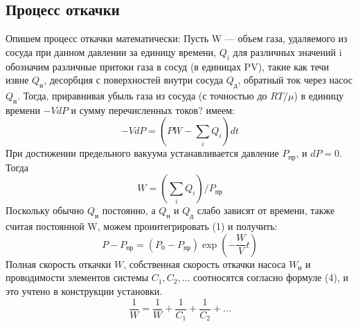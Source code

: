 \documentclass[12pt,a4paper]{article}
\begin{document}
 \subsection*{Процесс откачки}
Опишем процесс откачки математически: 
Пусть W --- объем газа, удаляемого из сосуда при данном давлении за единицу времени, $Q_i$ для различных значений i обозначим различные притоки газа в сосуд (в единицах PV), такие как течи извне $Q_\text{и}$, десорбция с поверхностей внутри сосуда $Q_\text{д}$, обратный ток через насос $Q_\text{н}$. Тогда, приравнивая убыль газа из сосуда (с точностью до $RT/\mu$) в единицу времени $-VdP$ и сумму перечисленных токов? имеем:
 \begin{equation}
 	-VdP = (PW - \sum_i Q_i)dt
 \end{equation}
 При достижении предельного вакуума устанавливается давление $P_{\text{пр}}$, и $dP = 0$. Тогда
 \begin{equation}
 	 W = ( \sum_i Q_i )/P_{\text{пр}}
 \end{equation}
 Поскольку обычно $Q_\text{и}$ постоянно, а $Q_\text{н}$ и $Q_\text{д}$ слабо зависят от времени, также считая постоянной W, можем проинтегрировать (1) и получить:
 \begin{equation}
 	P - P_{\text{пр}} = (P_0 - P_{\text{пр}})\exp(-\frac{W}{V}t)
 \end{equation}
Полная скорость откачки $W$, собственная скорость откачки насоса $W_{\text{н}}$ и проводимости элементов системы $C_1, C_2,...$ соотносятся согласно формуле (4), и это учтено в конструкции установки.
 \begin{equation}
 \frac{1}{W} = \frac{1}{W} + \frac{1}{C_1} + \frac{1}{C_2} + ...
\end{equation}
\end{document}
